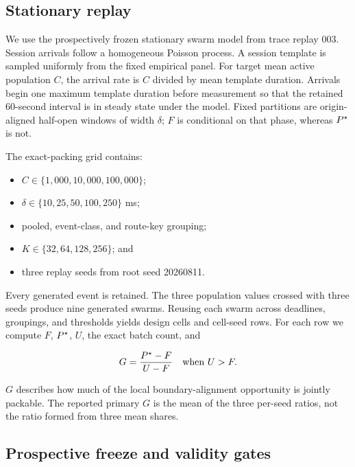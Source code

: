 \subsection{Stationary replay}

We use the prospectively frozen stationary swarm model from trace replay 003. Session
arrivals follow a homogeneous Poisson process. A session template is sampled
uniformly from the fixed empirical panel. For target mean active population
$C$, the arrival rate is $C$ divided by mean template duration. Arrivals begin
one maximum template duration before measurement so that the retained
60-second interval is in steady state under the model. Fixed partitions are
origin-aligned half-open windows of width $\delta$; $F$ is conditional on that
phase, whereas $P^\star$ is not.

The exact-packing grid contains:

\begin{itemize}
  \item $C\in\{1{,}000,10{,}000,100{,}000\}$;
  \item $\delta\in\{10,25,50,100,250\}$ ms;
  \item pooled, event-class, and route-key grouping;
  \item $K\in\{32,64,128,256\}$; and
  \item three replay seeds from root seed 20260811.
\end{itemize}

Every generated event is retained. The three population values crossed with
three seeds produce nine generated swarms. Reusing each swarm across deadlines,
groupings, and thresholds yields \TraceReplayCells{} design cells and
\TraceReplayRepetitions{} cell-seed rows. For each row we compute $F$, $P^\star$,
$U$, the exact batch count, and

\begin{equation}
  G=\frac{P^\star-F}{U-F}\quad\text{when }U>F.
  \label{eq:gap-closure}
\end{equation}

$G$ describes how much of the local boundary-alignment opportunity is jointly
packable. The reported primary $G$ is the mean of the three per-seed ratios,
not the ratio formed from three mean shares.

\subsection{Prospective freeze and validity gates}

